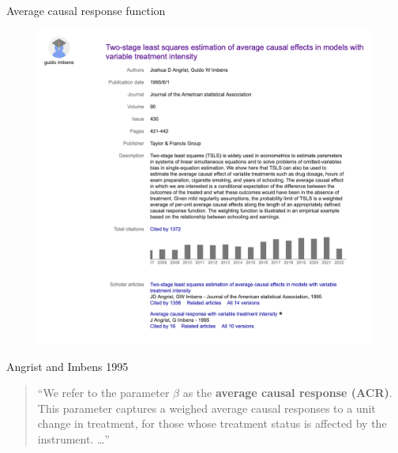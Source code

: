 \documentclass{beamer}
\begin{document}
\begin{frame}{Average causal response function}

\begin{figure}
\begin{center}
             \includegraphics[scale=0.3]{./lecture_includes/angrist_imbens_IV_intensity}
\end{center}
\end{figure}

\end{frame}


\begin{frame}{Angrist and Imbens 1995}

\begin{quote}
``We refer to the parameter $\beta$ as the \textbf{average causal response (ACR)}. This parameter captures a weighed average causal responses to a unit change in treatment, for those whose treatment status is affected by the instrument. \dots ''
\end{quote}

\end{frame}
\end{document}
